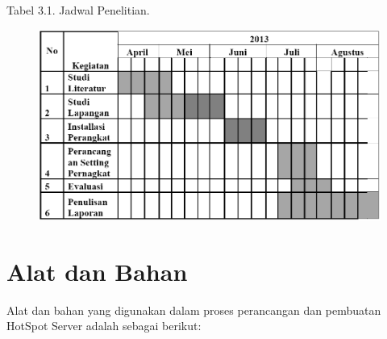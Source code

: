 \documentclass{jtetiproposalskripsi}
\begin{document}
\begin{center}
Tabel 3.1. Jadwal Penelitian.
\end{center}
\vspace{-0.5cm}
\begin{figure}[ht!]
  \centering
    \includegraphics[width=13cm]{gambar/tabelkegiatan}
\end{figure}

\section{Alat dan Bahan}
Alat dan bahan yang digunakan dalam proses perancangan dan pembuatan HotSpot Server adalah sebagai berikut:

\vspace{-0.5cm}
\end{document}
